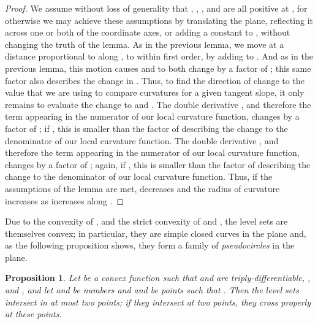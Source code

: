 \documentclass[10pt, conference, compsocconf]{IEEEtran}
\newtheorem{proposition}[theorem]{Proposition}
\begin{document}
\begin{proof}
We assume without loss of generality that , , , and  are all positive at , for otherwise we may achieve these assumptions by translating the plane, reflecting it across one or both of the coordinate axes, or adding a constant to , without changing the truth of the lemma.
As in the previous lemma, we move at a distance proportional to  along , to within first order, by adding  to . And as in the previous lemma, this motion causes  and  to both change by a factor of ; this same factor also describes the change in . Thus, to find the direction of change to
the value  that we are using to compare curvatures for a given tangent slope, it only remains to evaluate the change to  and . The double derivative , and therefore the term  appearing in the numerator of our local curvature function, changes by a factor of
; if , this is smaller than the factor of  describing the change to the denominator of our local curvature function. The double derivative , and therefore the term  appearing in the numerator of our local curvature function, changes by a factor of ; again, if , this is smaller than the factor of  describing the change to the denominator of our local curvature function. Thus, if the assumptions of the lemma are met,  decreases and the radius of curvature increases as  increases along .
\end{proof}

Due to the convexity of , and the strict convexity of  and , the level sets  are themselves convex; in particular, they are simple closed curves in the plane and, as the following proposition shows, they form a family of \emph{pseudocircles} in the plane.

\begin{proposition}
\label{prop:pseudocircles}
Let  be a convex function such that  and  are triply-differentiable, , and , and let  and  be numbers and  and  be points such that . Then the level sets  intersect in at most two points; if they intersect at two points, they cross properly at these points.
\end{proposition}
\end{document}
